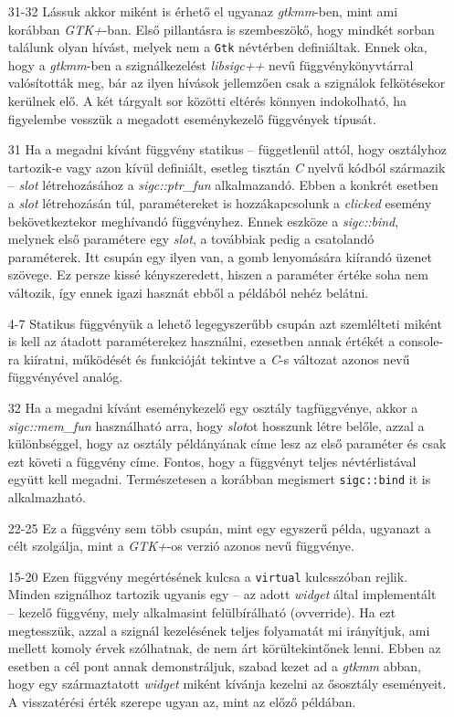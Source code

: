 \documentclass[a4paper,10pt]{article}
\begin{document}
\begin{enumerate}
 \item[31-32] Lássuk akkor miként is érhető el ugyanaz \textit{gtkmm}-ben, mint ami korábban \textit{GTK+}-ban. Első pillantásra is szembeszökő, hogy mindkét sorban találunk olyan hívást, melyek nem a \texttt{Gtk} névtérben definiáltak. Ennek oka, hogy a \textit{gtkmm}-ben a szignálkezelést \textit{libsigc++} nevű függvénykönyvtárral valósították meg, bár az ilyen hívások jellemzően csak a szignálok felkötésekor kerülnek elő. A két tárgyalt sor közötti eltérés könnyen indokolható, ha figyelembe vesszük a megadott eseménykezelő függvények típusát.

 \item[31] Ha a megadni kívánt függvény statikus -- függetlenül attól, hogy osztályhoz tartozik-e vagy azon kívül definiált, esetleg tisztán \textit{C} nyelvű kódból származik -- \textit{slot} létrehozásához a \textit{sigc::ptr\_fun} alkalmazandó. Ebben a konkrét esetben a \textit{slot} létrehozásán túl, paramétereket is hozzákapcsolunk a \textit{clicked} esemény bekövetkeztekor meghívandó függvényhez. Ennek eszköze a \textit{sigc::bind}, melynek első paramétere egy \textit{slot}, a továbbiak pedig a csatolandó paraméterek. Itt csupán egy ilyen van, a gomb lenyomására kiírandó üzenet szövege. Ez persze kissé kényszeredett, hiszen a paraméter értéke soha nem változik, így ennek igazi hasznát ebből a példából nehéz belátni.

 \item[4-7] Statikus függvényük a lehető legegyszerűbb csupán azt szemlélteti miként is kell az átadott paraméterekez használni, ezesetben annak értékét a console-ra kiíratni, működését és funkcióját tekintve a \textit{C}-s változat azonos nevű függvényével analóg.

 \item[32] Ha a megadni kívánt eseménykezelő egy osztály tagfüggvénye, akkor a \textit{sigc::mem\_fun} használható arra, hogy \textit{slot}ot hosszunk létre belőle, azzal a különbséggel, hogy az osztály példányának címe lesz az első paraméter és csak ezt követi a függvény címe. Fontos, hogy a függvényt teljes névtérlistával együtt kell megadni. Természetesen a korábban megismert \texttt{sigc::bind} it is alkalmazható.

 \item[22-25] Ez a függvény sem több csupán, mint egy egyszerű példa, ugyanazt a célt szolgálja, mint a \textit{GTK+}-os verzió azonos nevű függvénye.

 \item[15-20] Ezen függvény megértésének kulcsa a \texttt{virtual} kulcsszóban rejlik. Minden szignálhoz tartozik ugyanis egy -- az adott \textit{widget} által implementált -- kezelő függvény, mely alkalmasint felülbírálható (ovverride). Ha ezt megtesszük, azzal a szignál kezelésének teljes folyamatát mi irányítjuk, ami mellett komoly érvek szólhatnak, de nem árt körültekintőnek lenni. Ebben az esetben a cél pont annak demonstráljuk, szabad kezet ad a \textit{gtkmm} abban, hogy egy származtatott \textit{widget} miként kívánja kezelni az ősosztály eseményeit. A visszatérési érték szerepe ugyan az, mint az előző példában.
\end{enumerate}
\end{document}

